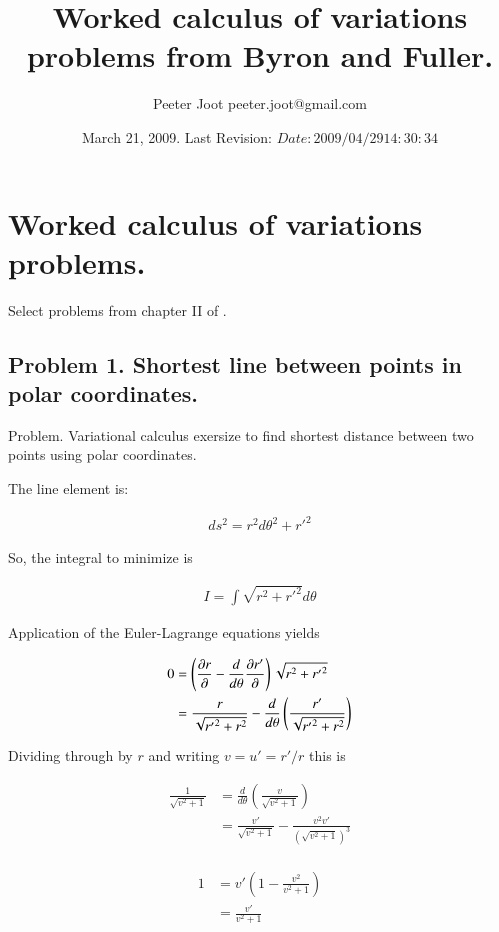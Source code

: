 \documentclass{article}
\title{ Worked calculus of variations problems from Byron and Fuller. }
\author{Peeter Joot \quad peeter.joot@gmail.com }
\date{ March 21, 2009.  Last Revision: $Date: 2009/04/29 14:30:34 $ }
\begin{document}
\maketitle{}
\tableofcontents

\section{ Worked calculus of variations problems. }

Select problems from chapter II of \cite{byron1992mca}.

\subsection{ Problem 1.  Shortest line between points in polar coordinates. }

Problem.  Variational calculus exersize to find shortest distance between two points using polar coordinates.
 
The line element is:
 
\begin{align*}
ds^2 = r^2 d\theta^2 + {r'}^2
\end{align*}
 
So, the integral to minimize is
 
\begin{align*}
I = \int \sqrt{ r^2 + {r'}^2 } d\theta
\end{align*}
 
Application of the Euler-Lagrange equations yields
 
\begin{align*}
0 
&= \left( \frac{\partial{r}}{\partial {}} - \frac{d}{d\theta} \frac{\partial{r'}}{\partial {}} \right) \sqrt{ r^2 + {r'}^2 }  \\
&= \frac{r}{\sqrt{{r'}^2 + r^2}} - \frac{d}{d\theta} \left( \frac{{r'}}{\sqrt{{r'}^2 + r^2}}\right) \\
\end{align*}
 
Dividing through by $r$ and writing $v = u' = {r'}/r$ this is
 
\begin{align*}
\frac{1}{\sqrt{v^2 + 1}}
&= \frac{d}{d\theta} \left( \frac{v}{\sqrt{v^2 + 1}}\right) \\
&= \frac{v'}{\sqrt{v^2 + 1}} -\frac{v^2 v'}{(\sqrt{v^2 + 1})^3} \\
\end{align*}
 
\begin{align*}
1 
&= v' \left( 1 -\frac{v^2 }{v^2 + 1} \right) \\
&= \frac{v'}{v^2 + 1} \\
\end{align*}
\end{document}

